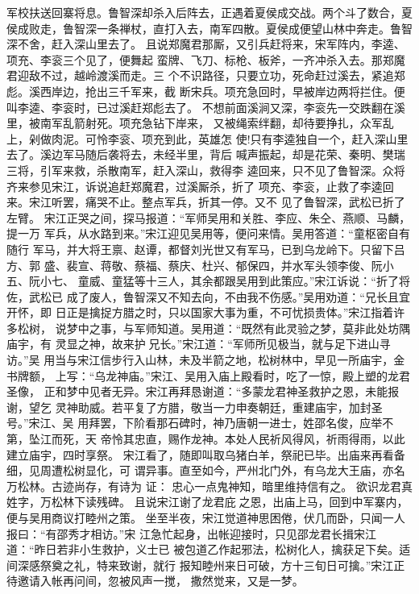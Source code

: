 军校扶送回寨将息。鲁智深却杀入后阵去，正遇着夏侯成交战。两个斗了数合，夏
侯成败走，鲁智深一条禅杖，直打入去，南军四散。夏侯成便望山林中奔走。鲁智
深不舍，赶入深山里去了。
且说郑魔君那厮，又引兵赶将来，宋军阵内，李逵、项充、李衮三个见了，便舞起
蛮牌、飞刀、标枪、板斧，一齐冲杀入去。那郑魔君迎敌不过，越岭渡溪而走。三
个不识路径，只要立功，死命赶过溪去，紧追郑彪。溪西岸边，抢出三千军来，截
断宋兵。项充急回时，早被岸边两将拦住。便叫李逵、李衮时，已过溪赶郑彪去了。
不想前面溪涧又深，李衮先一交跌翻在溪里，被南军乱箭射死。项充急钻下岸来，
又被绳索绊翻，却待要挣扎，众军乱上，剁做肉泥。可怜李衮、项充到此，英雄怎
使!只有李逵独自一个，赶入深山里去了。溪边军马随后袭将去，未经半里，背后
喊声振起，却是花荣、秦明、樊瑞三将，引军来救，杀散南军，赶入深山，救得李
逵回来，只不见了鲁智深。众将齐来参见宋江，诉说追赶郑魔君，过溪厮杀，折了
项充、李衮，止救了李逵回来。宋江听罢，痛哭不止。整点军兵，折其一停。又不
见了鲁智深，武松已折了左臂。
宋江正哭之间，探马报道：“军师吴用和关胜、李应、朱仝、燕顺、马麟，提一万
军兵，从水路到来。”宋江迎见吴用等，便问来情。吴用答道：“童枢密自有随行
军马，并大将王禀、赵谭，都督刘光世又有军马，已到乌龙岭下。只留下吕方、郭
盛、裴宣、蒋敬、蔡福、蔡庆、杜兴、郁保四，并水军头领李俊、阮小五、阮小七、
童威、童猛等十三人，其余都跟吴用到此策应。”宋江诉说：“折了将佐，武松已
成了废人，鲁智深又不知去向，不由我不伤感。”吴用劝道：“兄长且宜开怀，即
日正是擒捉方腊之时，只以国家大事为重，不可忧损贵体。”宋江指着许多松树，
说梦中之事，与军师知道。吴用道：“既然有此灵验之梦，莫非此处坊隅庙宇，有
灵显之神，故来护兄长。”宋江道：“军师所见极当，就与足下进山寻访。”吴
用当与宋江信步行入山林，未及半箭之地，松树林中，早见一所庙宇，金书牌额，
上写：“乌龙神庙。”宋江、吴用入庙上殿看时，吃了一惊，殿上塑的龙君圣像，
正和梦中见者无异。宋江再拜恳谢道：“多蒙龙君神圣救护之恩，未能报谢，望乞
灵神助威。若平复了方腊，敬当一力申奏朝廷，重建庙宇，加封圣号。”宋江、吴
用拜罢，下阶看那石碑时，神乃唐朝一进士，姓邵名俊，应举不第，坠江而死，天
帝怜其忠直，赐作龙神。本处人民祈风得风，祈雨得雨，以此建立庙宇，四时享祭。
宋江看了，随即叫取乌猪白羊，祭祀已毕。出庙来再看备细，见周遭松树显化，可
谓异事。直至如今，严州北门外，有乌龙大王庙，亦名万松林。古迹尚存，有诗为
证：
忠心一点鬼神知，暗里维持信有之。
欲识龙君真姓字，万松林下读残碑。
且说宋江谢了龙君庇之恩，出庙上马，回到中军寨内，便与吴用商议打睦州之策。
坐至半夜，宋江觉道神思困倦，伏几而卧，只闻一人报曰：“有邵秀才相访。”宋
江急忙起身，出帐迎接时，只见邵龙君长揖宋江道：“昨日若非小生救护，义士已
被包道乙作起邪法，松树化人，擒获足下矣。适间深感祭奠之礼，特来致谢，就行
报知睦州来日可破，方十三旬日可擒。”宋江正待邀请入帐再问间，忽被风声一搅，
撒然觉来，又是一梦。
